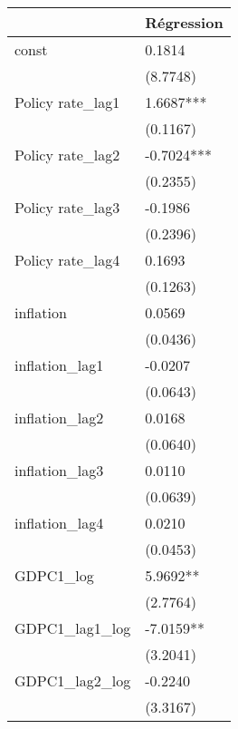 \begin{table}
\caption{}
\label{}
\begin{center}
\begin{tabular}{ll}
\hline
                       & Régression           \\
\hline
const                  & 0.1814               \\
                       & (8.7748)             \\
Policy rate\_lag1      & 1.6687***            \\
                       & (0.1167)             \\
Policy rate\_lag2      & -0.7024***           \\
                       & (0.2355)             \\
Policy rate\_lag3      & -0.1986              \\
                       & (0.2396)             \\
Policy rate\_lag4      & 0.1693               \\
                       & (0.1263)             \\
inflation              & 0.0569               \\
                       & (0.0436)             \\
inflation\_lag1        & -0.0207              \\
                       & (0.0643)             \\
inflation\_lag2        & 0.0168               \\
                       & (0.0640)             \\
inflation\_lag3        & 0.0110               \\
                       & (0.0639)             \\
inflation\_lag4        & 0.0210               \\
                       & (0.0453)             \\
GDPC1\_log             & 5.9692**             \\
                       & (2.7764)             \\
GDPC1\_lag1\_log       & -7.0159**            \\
                       & (3.2041)             \\
GDPC1\_lag2\_log       & -0.2240              \\
                       & (3.3167)             \\

\end{tabular}
\end{center}
\end{table}

